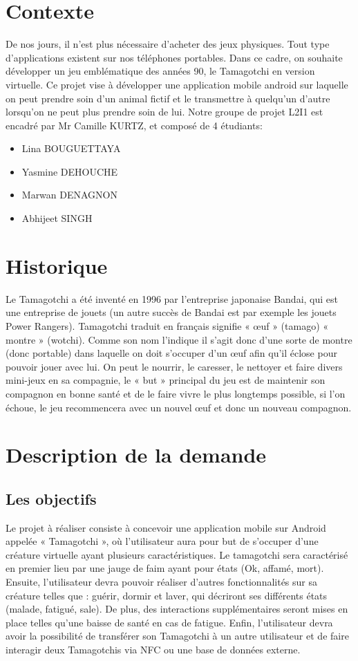 \documentclass{cahier_des_charges}
\begin{document}
\section{Contexte}
De nos jours, il n’est plus nécessaire d’acheter des jeux physiques. Tout type d’applications existent sur nos téléphones portables. Dans ce cadre, on souhaite développer un jeu emblématique des années 90, le Tamagotchi en version virtuelle. Ce projet vise à développer une application mobile android sur laquelle on peut prendre soin d’un animal fictif et le transmettre à quelqu’un d’autre lorsqu’on ne peut plus prendre soin de lui.
Notre groupe de projet L2I1 est encadré par Mr Camille KURTZ, et composé de 4 étudiants:
\begin{itemize}[label=\textbullet]
\item Lina BOUGUETTAYA


\item Yasmine DEHOUCHE


\item Marwan DENAGNON


\item Abhijeet SINGH
\end{itemize}
\section{Historique}
Le Tamagotchi a été inventé en 1996 par l’entreprise japonaise Bandai, qui est une entreprise de jouets (un autre succès de Bandai est par exemple les jouets Power Rangers). 
Tamagotchi traduit en français signifie « œuf » (tamago) « montre » (wotchi). Comme son nom l’indique il s’agit donc d’une sorte de montre (donc portable) dans laquelle on doit s’occuper d’un œuf afin qu’il éclose pour pouvoir jouer avec lui. 
On peut le nourrir, le caresser, le nettoyer et faire divers mini-jeux en sa compagnie, le « but » principal du jeu est de maintenir son compagnon en bonne santé et de le faire vivre le plus longtemps possible, si l’on échoue, le jeu recommencera avec un nouvel œuf et donc un nouveau compagnon.
\section{Description de la demande}
\subsection{Les objectifs}
Le projet à réaliser consiste à concevoir une application mobile sur Android appelée « Tamagotchi », où l’utilisateur aura pour but de s’occuper d’une créature virtuelle ayant plusieurs caractéristiques.
Le tamagotchi sera caractérisé en premier lieu par une jauge de faim ayant pour états (Ok, affamé, mort). Ensuite, l’utilisateur devra pouvoir réaliser d’autres fonctionnalités sur sa créature telles que : guérir, dormir et laver, qui décriront ses différents états (malade, fatigué, sale).
De plus, des interactions supplémentaires seront mises en place telles qu’une baisse de santé en cas de fatigue.
Enfin, l’utilisateur devra avoir la possibilité de transférer son Tamagotchi à un autre utilisateur et de faire interagir deux Tamagotchis via NFC ou une base de données externe.
\end{document}
